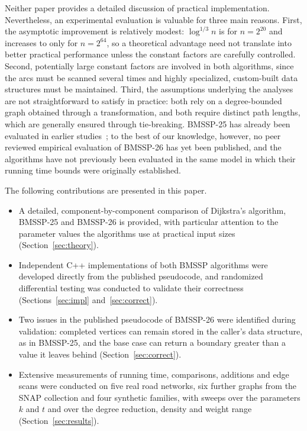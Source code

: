 \documentclass[conference,a4paper]{IEEEtran}
\newcommand{\bmA}{BMSSP-25}
\newcommand{\bmB}{BMSSP-26}
\begin{document}
Neither paper provides a detailed discussion of practical implementation. Nevertheless, an
experimental evaluation is valuable for three main reasons. First, the asymptotic improvement is
relatively modest: $\log^{1/3}n$ is \GainTwoFiveAtTwenty{} for $n=2^{20}$ and increases to only
\GainTwoFiveAtSixtyFour{} for $n=2^{64}$, so a theoretical advantage need not translate into
better practical performance unless the constant factors are carefully controlled. Second,
potentially large constant factors are involved in both algorithms, since the arcs must be
scanned several times and highly specialized, custom-built data structures must be maintained.
Third, the assumptions underlying the analyses are not straightforward to satisfy in practice:
both rely on a degree-bounded graph obtained through a transformation, and both require distinct
path lengths, which are generally ensured through tie-breaking. \bmA{} has already been evaluated
in earlier studies~\cite{castro2025,valko2025,makowski2025}; to the best of our knowledge,
however, no peer reviewed empirical evaluation of \bmB{} has yet been published, and the
algorithms have not previously been evaluated in the same model in which their running time
bounds were originally established.

The following contributions are presented in this paper.
\begin{itemize}
\item A detailed, component-by-component comparison of Dijkstra's algorithm, \bmA{} and \bmB{} is
provided, with particular attention to the parameter values the algorithms use at practical input
sizes (Section~\ref{sec:theory}).
\item Independent C++ implementations of both BMSSP algorithms were developed directly from the
published pseudocode, and randomized differential testing was conducted to validate their
correctness (Sections~\ref{sec:impl} and~\ref{sec:correct}).
\item Two issues in the published pseudocode of \bmB{} were identified during validation:
completed vertices can remain stored in the caller's data structure, as in \bmA, and the base
case can return a boundary greater than a value it leaves behind (Section~\ref{sec:correct}).
\item Extensive measurements of running time, comparisons, additions and edge scans were
conducted on five real road networks, six further graphs from the SNAP collection and four
synthetic families, with sweeps over the parameters $k$ and $t$ and over the degree reduction,
density and weight range (Section~\ref{sec:results}).
\end{itemize}
\end{document}
